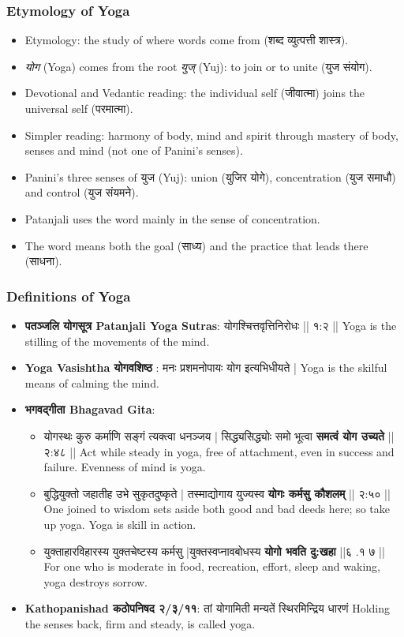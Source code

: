 \begin{frame}[fragile]\frametitle{Etymology of Yoga}

  \begin{itemize}
    \item Etymology: the study of where words come from (शब्द व्युत्पत्ती शास्त्र).
	\item \textit{योग} (Yoga) comes from the root \textit{युज्} (Yuj): to join or to unite (युज संयोग).
	\item Devotional and Vedantic reading: the individual self (जीवात्मा) joins the universal self (परमात्मा).
    \item Simpler reading: harmony of body, mind and spirit through mastery of body, senses and mind (not one of Panini's senses).
	\item Panini's three senses of युज (Yuj): union (युजिर योगे), concentration (युज समाधौ) and control (युज संयमने).
	\item Patanjali uses the word mainly in the sense of concentration.
	\item The word means both the goal (साध्य) and the practice that leads there (साधना).
  \end{itemize}

\end{frame}

\begin{frame}[fragile]\frametitle{Definitions of Yoga}
      \begin{itemize}
        \item \textbf{पतञ्जलि  योगसूत्र  Patanjali Yoga Sutras}:      योगश्चित्तवृत्तिनिरोधः || १:२ || Yoga is the stilling of the movements of the mind.
        \item \textbf{Yoga Vasishtha योगवशिष्ठ }:          मनः प्रशमनोपायः योग इत्यभिधीयते | Yoga is the skilful means of calming the mind.
        \item \textbf{भगवद्गीता  Bhagavad Gita}:         
		      \begin{itemize}
				\item  योगस्थः कुरु कर्माणि सङ्गं त्यक्त्वा धनञ्जय |   सिद्ध्यसिद्ध्योः समो भूत्वा \textbf{समत्वं योग उच्यते }|| २:४८ || Act while steady in yoga, free of attachment, even in success and failure. Evenness of mind is yoga.
				\item बुद्धियुक्तो जहातीह उभे सुकृतदुष्कृते |      तस्माद्योगाय युज्यस्व \textbf{योगः कर्मसु कौशलम् }|| २:५० || One joined to wisdom sets aside both good and bad deeds here; so take up yoga. Yoga is skill in action.
				\item युक्ताहारविहारस्य युक्तचेष्टस्य कर्मसु |युक्तस्वप्नावबोधस्य \textbf{योगो भवति दु:खहा }||६ .१ ७ || For one who is moderate in food, recreation, effort, sleep and waking, yoga destroys sorrow.
				\end{itemize}
		\item \textbf{Kathopanishad कठोपनिषद २/३/११}: तां योगामिती मन्यतें स्थिरमिन्द्रिय धारणं Holding the senses back, firm and steady, is called yoga.
      \end{itemize}
\end{frame}

